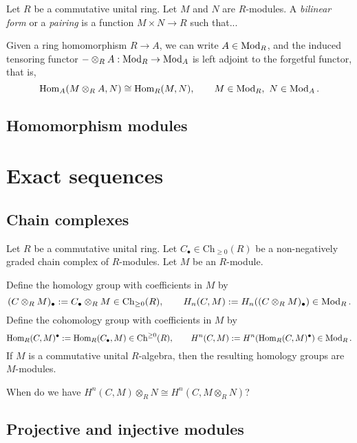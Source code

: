 \documentclass{../../large}
\begin{document}
\begin{prb}
Let $R$ be a commutative unital ring.
Let $M$ and $N$ are $R$-modules.
A \emph{bilinear form} or a \emph{pairing} is a function $M\times N\to R$ such that...



\end{prb}


\begin{prb}
Given a ring homomorphism $R\to A$, we can write $A\in\operatorname{Mod}_R$, and the induced tensoring functor $-\otimes_RA:\operatorname{Mod}_R\to\operatorname{Mod}_A$ is left adjoint to the forgetful functor, that is,
\[\operatorname{Hom}_A(M\otimes_RA,N)\cong\operatorname{Hom}_R(M,N),\qquad M\in\operatorname{Mod}_R,\ N\in\operatorname{Mod}_A.\]
\end{prb}


\section{Homomorphism modules}



\chapter{Exact sequences}



\section{Chain complexes}


Let $R$ be a commutative unital ring.
Let $C_\bullet\in\mathrm{Ch}_{\ge0}(R)$ be a non-negatively graded chain complex of $R$-modules.
Let $M$ be an $R$-module.

Define the homology group with coefficients in $M$ by
\[(C\otimes_RM)_\bullet:=C_\bullet\otimes_RM\in\mathrm{Ch}_{\ge0}(R),\qquad H_n(C,M):=H_n((C\otimes_RM)_\bullet)\in\operatorname{Mod}_R.\]
Define the cohomology group with coefficients in $M$ by
\[\operatorname{Hom}_R(C,M)^\bullet:=\operatorname{Hom}_R(C_\bullet,M)\in\mathrm{Ch}^{\ge0}(R),\qquad H^n(C,M):=H^n(\operatorname{Hom}_R(C,M)^\bullet)\in\operatorname{Mod}_R.\]
If $M$ is a commutative unital $R$-algebra, then the resulting homology groups are $M$-modules.

When do we have $H^n(C,M)\otimes_RN\cong H^n(C,M\otimes_RN)$?




\section{Projective and injective modules}
\end{document}
